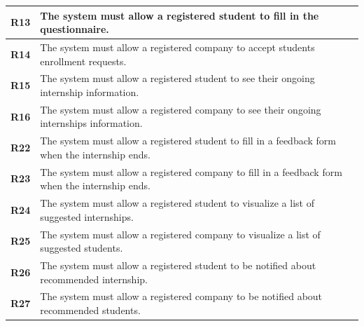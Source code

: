 \begin{table}[H]
\begin{tabular}{|l|m{10cm}|}
        \hline \textbf{R13} & The system must allow a registered student to fill in the questionnaire. \\
        \hline \textbf{R14} & The system must allow a registered company to accept students enrollment requests. \\
        \hline \textbf{R15} & The system must allow a registered student to see their ongoing internship information. \\
        \hline \textbf{R16} & The system must allow a registered company to see their ongoing internships information. \\
        \hline \textbf{R22} & The system must allow a registered student to fill in a feedback form when the internship ends. \\
        \hline \textbf{R23} & The system must allow a registered company to fill in a feedback form when the internship ends. \\
        \hline \textbf{R24} & The system must allow a registered student to visualize a list of suggested internships. \\
        \hline \textbf{R25} & The system must allow a registered company to visualize a list of suggested students. \\
        \hline \textbf{R26} & The system must allow a registered student to be notified about recommended internship. \\
        \hline \textbf{R27} & The system must allow a registered company to be notified about recommended students. \\
        \hline
    \end{tabular}
\end{table}


